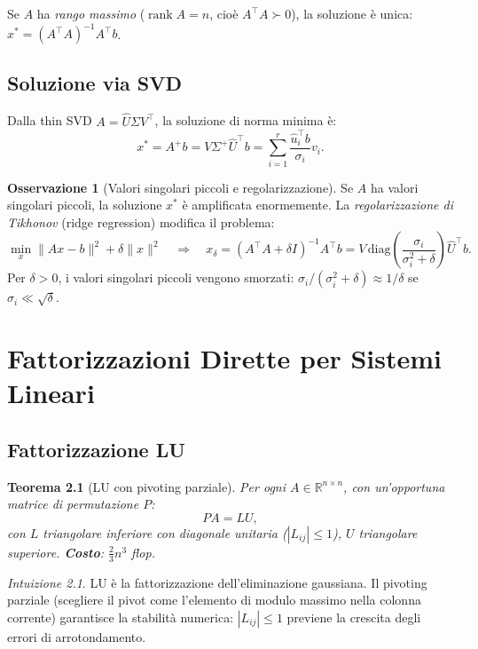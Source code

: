 \documentclass[11pt, a4paper, twoside]{book}
\theoremstyle{definition}
\newtheorem{remark}{Osservazione}[chapter]
\theoremstyle{plain}
\newtheorem{thm}{Teorema}[chapter]
\theoremstyle{remark}
\newtheorem{intuition}{Intuizione}[chapter]
\DeclareMathOperator{\rank}{rank}
\newcommand{\R}{\mathbb{R}}
\begin{document}
Se $A$ ha \emph{rango massimo} ($\rank A = n$, cioè $A^\top A \succ 0$), la soluzione è unica: $x^* = (A^\top A)^{-1} A^\top b$.

\section{Soluzione via SVD}

Dalla thin SVD $A = \hat{U}\Sigma V^\top$, la soluzione di norma minima è:
\[
  x^* = A^+ b = V \Sigma^+ \hat{U}^\top b = \sum_{i=1}^r \frac{\hat{u}_i^\top b}{\sigma_i} v_i.
\]

\begin{remark}[Valori singolari piccoli e regolarizzazione]
\label{sec:tikhonov}
Se $A$ ha valori singolari piccoli, la soluzione $x^*$ è amplificata enormemente. La \emph{regolarizzazione di Tikhonov} (ridge regression) modifica il problema:
\[
  \min_x \|Ax - b\|^2 + \delta\|x\|^2 \quad \Rightarrow \quad x_\delta = (A^\top A + \delta I)^{-1} A^\top b = V \, \mathrm{diag}\!\left(\frac{\sigma_i}{\sigma_i^2 + \delta}\right) \hat{U}^\top b.
\]
Per $\delta > 0$, i valori singolari piccoli vengono smorzati: $\sigma_i/(\sigma_i^2 + \delta) \approx 1/\delta$ se $\sigma_i \ll \sqrt{\delta}$.
\end{remark}

\chapter{Fattorizzazioni Dirette per Sistemi Lineari}

\section{Fattorizzazione LU}
\label{sec:lu}

\begin{thm}[LU con pivoting parziale]
Per ogni $A \in \R^{n \times n}$, con un'opportuna matrice di permutazione $P$:
\[
  PA = LU,
\]
con $L$ triangolare inferiore con diagonale unitaria ($|L_{ij}| \leq 1$), $U$ triangolare superiore. \textbf{Costo}: $\frac{2}{3}n^3$ flop.
\end{thm}

\begin{intuition}
LU è la fattorizzazione dell'eliminazione gaussiana. Il pivoting parziale (scegliere il pivot come l'elemento di modulo massimo nella colonna corrente) garantisce la stabilità numerica: $|L_{ij}| \leq 1$ previene la crescita degli errori di arrotondamento.
\end{intuition}
\end{document}
